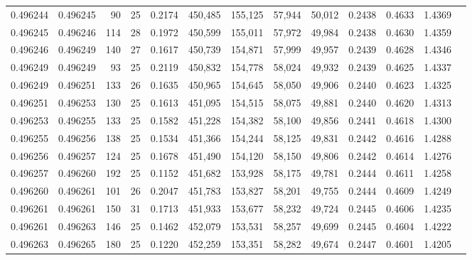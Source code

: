\begin{tabular}{rrrrrrrrrrrrr}
0.496244 & 0.496245 &  90 &  25 &                                     0.2174 & 450,485 & 155,125 &  57,944 &  50,012 & 0.2438 & 0.4633 & 1.4369 \\
0.496245 & 0.496246 & 114 &  28 &                                     0.1972 & 450,599 & 155,011 &  57,972 &  49,984 & 0.2438 & 0.4630 & 1.4359 \\
0.496246 & 0.496249 & 140 &  27 &                                     0.1617 & 450,739 & 154,871 &  57,999 &  49,957 & 0.2439 & 0.4628 & 1.4346 \\
0.496249 & 0.496249 &  93 &  25 &                                     0.2119 & 450,832 & 154,778 &  58,024 &  49,932 & 0.2439 & 0.4625 & 1.4337 \\
0.496249 & 0.496251 & 133 &  26 &                                     0.1635 & 450,965 & 154,645 &  58,050 &  49,906 & 0.2440 & 0.4623 & 1.4325 \\
0.496251 & 0.496253 & 130 &  25 &                                     0.1613 & 451,095 & 154,515 &  58,075 &  49,881 & 0.2440 & 0.4620 & 1.4313 \\
0.496253 & 0.496255 & 133 &  25 &                                     0.1582 & 451,228 & 154,382 &  58,100 &  49,856 & 0.2441 & 0.4618 & 1.4300 \\
0.496255 & 0.496256 & 138 &  25 &                                     0.1534 & 451,366 & 154,244 &  58,125 &  49,831 & 0.2442 & 0.4616 & 1.4288 \\
0.496256 & 0.496257 & 124 &  25 &                                     0.1678 & 451,490 & 154,120 &  58,150 &  49,806 & 0.2442 & 0.4614 & 1.4276 \\
0.496257 & 0.496260 & 192 &  25 &                                     0.1152 & 451,682 & 153,928 &  58,175 &  49,781 & 0.2444 & 0.4611 & 1.4258 \\
0.496260 & 0.496261 & 101 &  26 &                                     0.2047 & 451,783 & 153,827 &  58,201 &  49,755 & 0.2444 & 0.4609 & 1.4249 \\
0.496261 & 0.496261 & 150 &  31 &                                     0.1713 & 451,933 & 153,677 &  58,232 &  49,724 & 0.2445 & 0.4606 & 1.4235 \\
0.496261 & 0.496263 & 146 &  25 &                                     0.1462 & 452,079 & 153,531 &  58,257 &  49,699 & 0.2445 & 0.4604 & 1.4222 \\
0.496263 & 0.496265 & 180 &  25 &                                     0.1220 & 452,259 & 153,351 &  58,282 &  49,674 & 0.2447 & 0.4601 & 1.4205 \\

\end{tabular}
